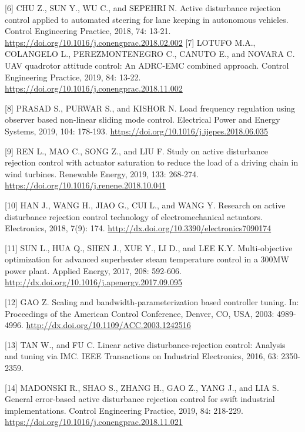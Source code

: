 \documentclass[10pt]{article}
\begin{document}
[6] CHU Z., SUN Y., WU C., and SEPEHRI N. Active disturbance rejection control applied to automated steering for lane keeping in autonomous vehicles. Control Engineering Practice, 2018, 74: 13-21. \href{https://doi.org/10.1016/j.conengprac.2018.02.002}{https://doi.org/10.1016/j.conengprac.2018.02.002} [7] LOTUFO M.A., COLANGELO L., PEREZMONTENEGRO C., CANUTO E., and NOVARA C. UAV quadrotor attitude control: An ADRC-EMC combined approach. Control Engineering Practice, 2019, 84: 13-22. \href{https://doi.org/10.1016/j.conengprac.2018.11.002}{https://doi.org/10.1016/j.conengprac.2018.11.002}

[8] PRASAD S., PURWAR S., and KISHOR N. Load frequency regulation using observer based non-linear sliding mode control. Electrical Power and Energy Systems, 2019, 104: 178-193. \href{https://doi.org/10.1016/j.ijepes.2018.06.035}{https://doi.org/10.1016/j.ijepes.2018.06.035}

[9] REN L., MAO C., SONG Z., and LIU F. Study on active disturbance rejection control with actuator saturation to reduce the load of a driving chain in wind turbines. Renewable Energy, 2019, 133: 268-274. \href{https://doi.org/10.1016/j.renene.2018.10.041}{https://doi.org/10.1016/j.renene.2018.10.041}

[10] HAN J., WANG H., JIAO G., CUI L., and WANG Y. Research on active disturbance rejection control technology of electromechanical actuators. Electronics, 2018, 7(9): 174. \href{http://dx.doi.org/10.3390/electronics7090174}{http://dx.doi.org/10.3390/electronics7090174}

[11] SUN L., HUA Q., SHEN J., XUE Y., LI D., and LEE K.Y. Multi-objective optimization for advanced superheater steam temperature control in a $300 \mathrm{MW}$ power plant. Applied Energy, 2017, 208: 592-606. \href{http://dx.doi.org/10.1016/j.apenergy.2017.09.095}{http://dx.doi.org/10.1016/j.apenergy.2017.09.095}

[12] GAO Z. Scaling and bandwidth-parameterization based controller tuning. In: Proceedings of the American Control Conference, Denver, CO, USA, 2003: 4989-4996. \href{http://dx.doi.org/10.1109/ACC.2003.1242516}{http://dx.doi.org/10.1109/ACC.2003.1242516}

[13] TAN W., and FU C. Linear active disturbance-rejection control: Analysis and tuning via IMC. IEEE Transactions on Industrial Electronics, 2016, 63: 2350-2359.

[14] MADONSKI R., SHAO S., ZHANG H., GAO Z., YANG J., and LIA S. General error-based active disturbance rejection control for swift industrial implementations. Control Engineering Practice, 2019, 84: 218-229. \href{https://doi.org/10.1016/j.conengprac.2018.11.021}{https://doi.org/10.1016/j.conengprac.2018.11.021}
\end{document}
